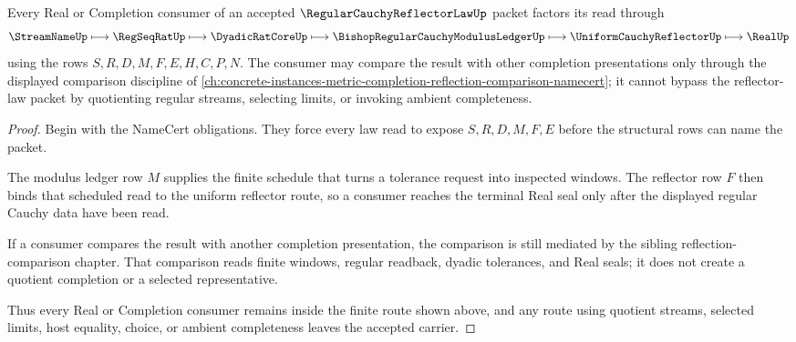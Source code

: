 \begin{theorem}
\label{thm:regular-cauchy-reflector-law-completion-consumer}
Every Real or Completion consumer of an accepted $\RegularCauchyReflectorLawUp$ packet factors its read through
$$
\StreamNameUp \longmapsto \RegSeqRatUp \longmapsto \DyadicRatCoreUp \longmapsto \BishopRegularCauchyModulusLedgerUp \longmapsto \UniformCauchyReflectorUp \longmapsto \RealUp
$$
using the rows $S,R,D,M,F,E,H,C,P,N$. The consumer may compare the result with other completion presentations only through the displayed comparison discipline of \autoref{ch:concrete-instances-metric-completion-reflection-comparison-namecert}; it cannot bypass the reflector-law packet by quotienting regular streams, selecting limits, or invoking ambient completeness.
\end{theorem}
\begin{proof}
Begin with the NameCert obligations. They force every law read to expose $S,R,D,M,F,E$ before the structural rows can name the packet.

The modulus ledger row $M$ supplies the finite schedule that turns a tolerance request into inspected windows. The reflector row $F$ then binds that scheduled read to the uniform reflector route, so a consumer reaches the terminal Real seal only after the displayed regular Cauchy data have been read.

If a consumer compares the result with another completion presentation, the comparison is still mediated by the sibling reflection-comparison chapter. That comparison reads finite windows, regular readback, dyadic tolerances, and Real seals; it does not create a quotient completion or a selected representative.

Thus every Real or Completion consumer remains inside the finite route shown above, and any route using quotient streams, selected limits, host equality, choice, or ambient completeness leaves the accepted carrier.
\end{proof}



